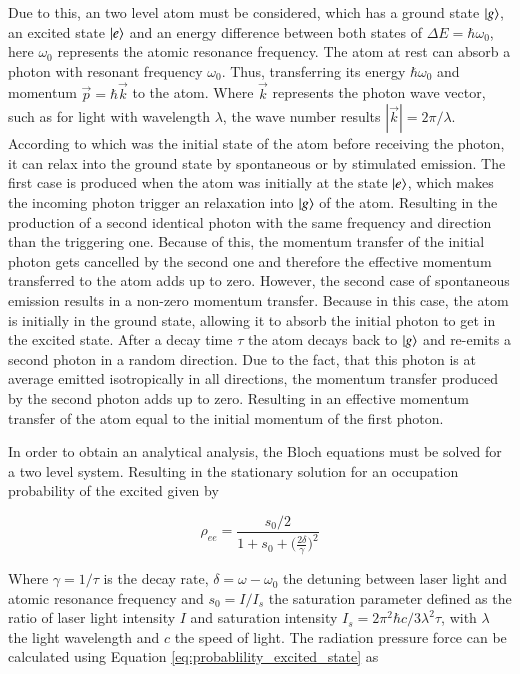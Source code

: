 Due to this, an two level atom must be considered, which has a ground state $\ket{g}$, an excited state $\ket{e}$ and an energy difference between both states of $\Delta E = \hbar \omega_0$, here $\omega_0$ represents the atomic resonance frequency. The atom at rest can absorb a photon with resonant frequency $\omega_0$. Thus, transferring its energy $\hbar \omega_0$ and momentum $\vec{p}= \hbar \vec{k}$ to the atom. Where $\vec{k}$ represents the photon wave vector, such as for light with wavelength $\lambda$, the wave number results $|\vec{k}| = 2 \pi / \lambda$. According to which was the initial state of the atom before receiving the photon, it can relax into the ground state by spontaneous or by stimulated emission. The first case is produced when the atom was initially at the state $\ket{e}$, which makes the incoming photon trigger an relaxation into $\ket{g}$ of the atom. Resulting in the production of a second identical photon with the same frequency and direction than the triggering one. Because of this, the momentum transfer of the initial photon gets cancelled by the second one and therefore the effective momentum transferred to the atom adds up to zero. However, the second case of spontaneous emission results in a non-zero momentum transfer. Because in this case, the atom is initially in the ground state, allowing it to absorb the initial photon to get in the excited state. After a decay time $\tau$ the atom decays back to $\ket{g}$ and re-emits a second photon in a random direction. Due to the fact, that this photon is at average emitted isotropically in all directions, the momentum transfer produced by the second photon adds up to zero. Resulting in an effective momentum transfer of the atom equal to the initial momentum of the first photon.

In order to obtain an analytical analysis, the Bloch equations must be solved for a two level system. Resulting in the stationary solution for an occupation probability of the excited given by

\begin{equation}\label{eq:probablility_excited_state}
	\rho_{ee} = \frac{s_0/2}{1 + s_0 + \Big(\frac{2\delta}{\gamma}\Big)^2}
\end{equation}

Where $\gamma = 1/\tau$ is the decay rate, $\delta = \omega - \omega_0$ the detuning between laser light and atomic resonance  frequency and $s_0 = I / I_s$ the saturation parameter defined as the ratio of laser light intensity $I$ and saturation intensity $I_s = 2 \pi^2 \hbar c/ 3 \lambda^2 \tau$, with $\lambda$ the light wavelength and $c$ the speed of light. The radiation pressure force can be calculated using Equation  \eqref{eq:probablility_excited_state} as

